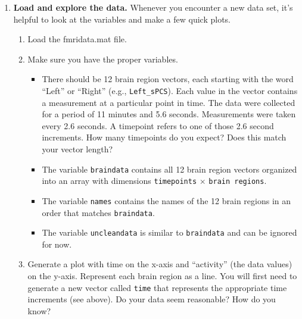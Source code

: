 \begin{prob}
\begin{enumerate}
\item \textbf{Load and explore the data.} Whenever you encounter a new data set, it's helpful to look at the variables and make a few quick plots.
\begin{enumerate}
	\item Load the fmridata.mat file.
	\item Make sure you have the proper variables.
	\begin{itemize}
		\item There should be 12 brain region vectors, each starting with the word ``Left'' or ``Right'' (e.g., \texttt{Left\_sPCS}). Each value in the vector contains a measurement at a particular point in time. The data were collected for a period of 11 minutes and 5.6 seconds. Measurements were taken every 2.6 seconds.  A timepoint refers to one of those 2.6 second increments. How many timepoints do you expect? Does this match your vector length?
		\item The variable \texttt{braindata} contains all 12 brain region vectors organized into an array with dimensions \texttt{timepoints} $\times$ \texttt{brain regions}.
		\item The variable \texttt{names} contains the names of the 12 brain regions in an order that matches \texttt{braindata}.
		\item The variable \texttt{uncleandata} is similar to \texttt{braindata} and can be ignored for now.
\end{itemize}

	\item Generate a plot with time on the x-axis and ``activity'' (the data values) on the y-axis. Represent each brain region as a line. You will first need to generate a new vector called \texttt{time} that represents the appropriate time increments (see above). Do your data seem reasonable? How do you know?
	

\end{enumerate}



\end{enumerate}
\end{prob}
